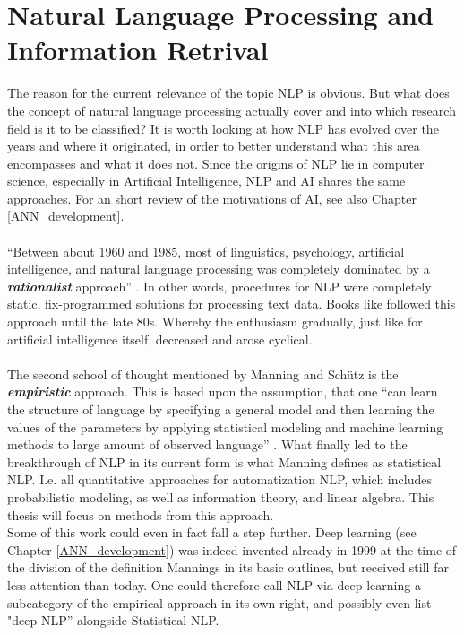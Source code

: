 \documentclass[11pt,a4paper]{article}
\begin{document}
	

\section{Natural Language Processing and Information Retrival} \label{sec:NLP}

The reason for the current relevance of the topic NLP is obvious. But what does the concept of natural language processing actually cover and into which research field is it to be classified? It is worth looking at how NLP has evolved over the years and where it originated, in order to better understand what this area encompasses and what it does not. Since the origins of NLP lie in computer science, especially in Artificial Intelligence, NLP and AI shares the same approaches. For an short review of the motivations of AI, see also Chapter \ref{ANN_development}.  \\
\ \\
“Between about 1960 and 1985, most of linguistics, psychology, artificial intelligence, and natural language processing was completely dominated by a \textbf{\textit{rationalist}} approach” \cite[p. 4]{Manning1999}. In other words, procedures for NLP were completely static, fix-programmed solutions for processing text data. Books like \cite{Noble1988} followed this approach until the late 80s. Whereby the enthusiasm gradually, just like for artificial intelligence itself, decreased and arose cyclical.\\
\ \\
The second school of thought mentioned by Manning and Schütz is the \textit{\textbf{empiristic}} approach.
This is based upon the assumption, that one “can learn the structure of language by specifying a general model and then learning the values of the parameters by applying statistical modeling and machine learning methods to large amount of observed language” \cite[p. 253]{Martinez2010}. What finally led to the breakthrough of NLP in its current form is what Manning defines as statistical NLP. I.e. all quantitative approaches for automatization NLP, which includes probabilistic modeling, as well as information theory, and linear algebra. This thesis will focus on methods from this approach.\\
Some of this work could even in fact fall a step further. Deep learning (see Chapter \ref{ANN_development}) was indeed invented already in 1999 at the time of the division of the definition Mannings in its basic outlines, but received still far less attention than today. One could therefore call NLP via deep learning a subcategory of the empirical approach in its own right, and possibly even list "deep NLP” alongside Statistical NLP.\\
\end{document}
